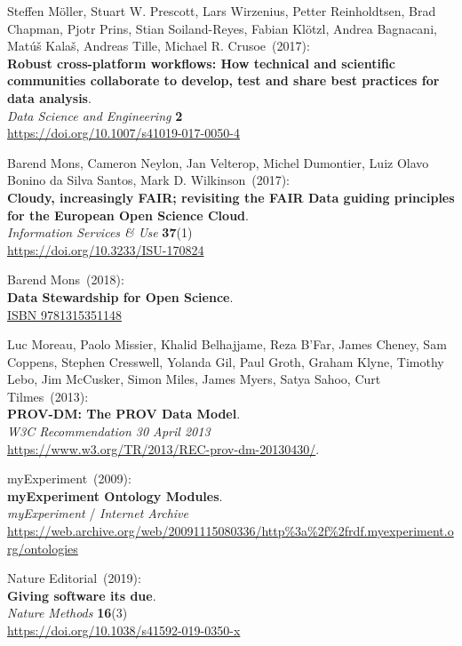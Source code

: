 \begin{thebibliography}{9}
Steffen Möller, Stuart W. Prescott, Lars Wirzenius, Petter Reinholdtsen, Brad Chapman, Pjotr Prins, Stian Soiland-Reyes, Fabian Klötzl, Andrea Bagnacani, Matúš Kalaš, Andreas Tille, Michael R. Crusoe~(2017): \\
\textbf{Robust cross-platform workflows: How technical and scientific communities collaborate to develop, test and share best practices for data analysis}.\\
\emph{Data Science and Engineering} \textbf{2}\\
\url{https://doi.org/10.1007/s41019-017-0050-4}

Barend Mons, Cameron Neylon, Jan Velterop, Michel Dumontier, Luiz Olavo Bonino da Silva Santos, Mark D. Wilkinson~(2017): \\
\textbf{Cloudy, increasingly FAIR; revisiting the FAIR Data guiding principles for the European Open Science Cloud}.\\
\emph{Information Services \& Use} \textbf{37}(1)\\
\url{https://doi.org/10.3233/ISU-170824}

Barend Mons~(2018): \\
\textbf{Data Stewardship for Open Science}.\\
\href{https://identifiers.org/isbn/9781315351148}{ISBN 9781315351148}

Luc Moreau, Paolo Missier, Khalid Belhajjame, Reza B'Far, James Cheney, Sam Coppens, Stephen Cresswell, Yolanda Gil, Paul Groth, Graham Klyne, Timothy Lebo, Jim McCusker, Simon Miles, James Myers, Satya Sahoo, Curt Tilmes~(2013): \\
\textbf{PROV-DM: The PROV Data Model}. \\
\emph{W3C Recommendation 30 April 2013}\\
\url{https://www.w3.org/TR/2013/REC-prov-dm-20130430/}.

myExperiment~(2009): \\
\textbf{myExperiment Ontology Modules}.\\
\emph{myExperiment} / \emph{Internet Archive}\\
\url{https://web.archive.org/web/20091115080336/http\%3a\%2f\%2frdf.myexperiment.org/ontologies}

Nature Editorial~(2019): \\
\textbf{Giving software its due}.\\
\emph{Nature Methods} \textbf{16}(3)\\
\url{https://doi.org/10.1038/s41592-019-0350-x}


\end{thebibliography}
